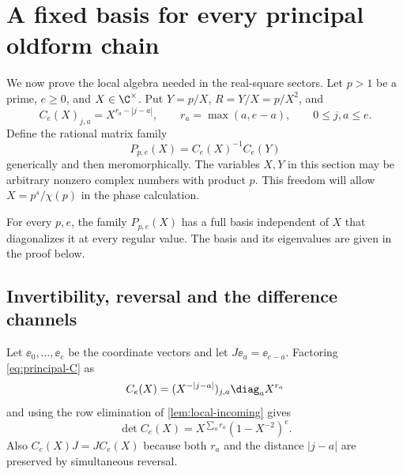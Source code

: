 \section{A fixed basis for every principal oldform chain}\label{sec:principal}

We now prove the local algebra needed in the real-square sectors.
Let \(p>1\) be a prime, \(e\ge0\), and \(X\in\C^\times\).
Put \(Y=p/X\), \(R=Y/X=p/X^2\), and
\begin{equation}\label{eq:principal-C}
 C_e(X)_{j,a}=X^{r_a-|j-a|},\qquad
 r_a=\max(a,e-a),\qquad 0\le j,a\le e.
\end{equation}
Define the rational matrix family
\[
 P_{p,e}(X)=C_e(X)^{-1}C_e(Y)
\]
generically and then meromorphically. The variables \(X,Y\) in this
section may be arbitrary nonzero complex numbers with product \(p\).
This freedom will allow \(X=p^s/\chi(p)\) in the phase calculation.

\begin{proposition}\label{prop:principal-basis}
For every \(p,e\), the family \(P_{p,e}(X)\) has a full basis
independent of \(X\) that diagonalizes it at every regular value.
The basis and its eigenvalues are given in the proof below.
\end{proposition}

\subsection{Invertibility, reversal and the difference channels}

Let \(\ee_0,\ldots,\ee_e\) be the coordinate vectors and let
\(J\ee_a=\ee_{e-a}\). Factoring \eqref{eq:principal-C} as
\[
 C_e(X)=(X^{-|j-a|})_{j,a}\diag_a X^{r_a}
\]
and using the row elimination of \cref{lem:local-incoming} gives
\begin{equation}\label{eq:principal-det}
 \det C_e(X)=X^{\sum_a r_a}(1-X^{-2})^e .
\end{equation}
Also \(C_e(X)J=JC_e(X)\) because both \(r_a\) and the distance
\(|j-a|\) are preserved by simultaneous reversal.

